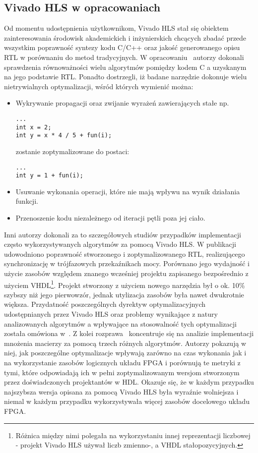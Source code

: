 \subsection{Vivado HLS w opracowaniach}
Od momentu udostępnienia użytkownikom, Vivado HLS stał się obiektem zainteresowania środowisk akademickich i inżynierskich chcących zbadać przede wszystkim poprawność syntezy kodu C/C++ oraz jakość generowanego opisu RTL w porównaniu do metod tradycyjnych. W opracowaniu~\cite{C_VERILOG} autorzy dokonali sprawdzenia równoważności wielu algorytmów pomiędzy kodem C a uzyskanym na jego podstawie RTL. Ponadto dostrzegli, iż badane narzędzie dokonuje wielu nietrywialnych optymalizacji, wśród których wymienić można:
\begin{itemize}
\item Wykrywanie propagacji oraz zwijanie wyrażeń zawierających stałe np.  
\begin{lstlisting}
...
int x = 2;
int y = x * 4 / 5 + fun(i);
\end{lstlisting}
zostanie zoptymalizowane do postaci:
\begin{lstlisting}
...
int y = 1 + fun(i);
\end{lstlisting}
\item Usuwanie wykonania operacji, które nie mają wpływu na wynik działania funkcji.
\item Przenoszenie kodu niezależnego od iteracji pętli poza jej ciało.
\end{itemize}
Inni autorzy dokonali za to szczegółowych studiów przypadków implementacji często wykorzystywanych algorytmów za pomocą Vivado HLS. W publikacji~\cite{HLS_HDL_GRID} udowodniono poprawność stworzonego i zoptymalizowanego RTL, realizującego synchronizację w trójfazowych przekaźnikach mocy. Porównano jego wydajność i użycie zasobów względem znanego wcześniej projektu zapisanego bezpośrednio z użyciem VHDL\footnote{Różnica między nimi polegała na wykorzystaniu innej reprezentacji liczbowej - projekt Vivado HLS używał liczb zmienno-, a VHDL stałopozycyjnych.}. Projekt stworzony z użyciem nowego narzędzia był o ok. 10\% szybszy niż jego pierwowzór, jednak utylizacja zasobów była nawet dwukrotnie większa. Przydatność poszczególnych dyrektyw optymalizacyjnych udostępnianych przez Vivado HLS oraz problemy wynikające z natury analizowanych algorytmów a wpływające na stosowalność tych optymalizacji została omówiona w~\cite{VHLS_ESD}. Z kolei rozprawa~\cite{HLS_HDL_MATRIX} koncentruje się na analizie implementacji mnożenia macierzy za pomocą trzech różnych algorytmów. Autorzy pokazują w niej, jak poszczególne optymalizacje wpływają zarówno na czas wykonania jak i na wykorzystanie zasobów logicznych układu FPGA i porównują te metryki z tymi, które odpowiadają ich w pełni zoptymalizowanym wersjom stworzonym przez doświadczonych projektantów w HDL. Okazuje się, że w każdym przypadku najszybsza wersja opisana za pomocą Vivado HLS była wyraźnie wolniejsza i niemal w każdym przypadku wykorzystywała więcej zasobów docelowego układu FPGA.

